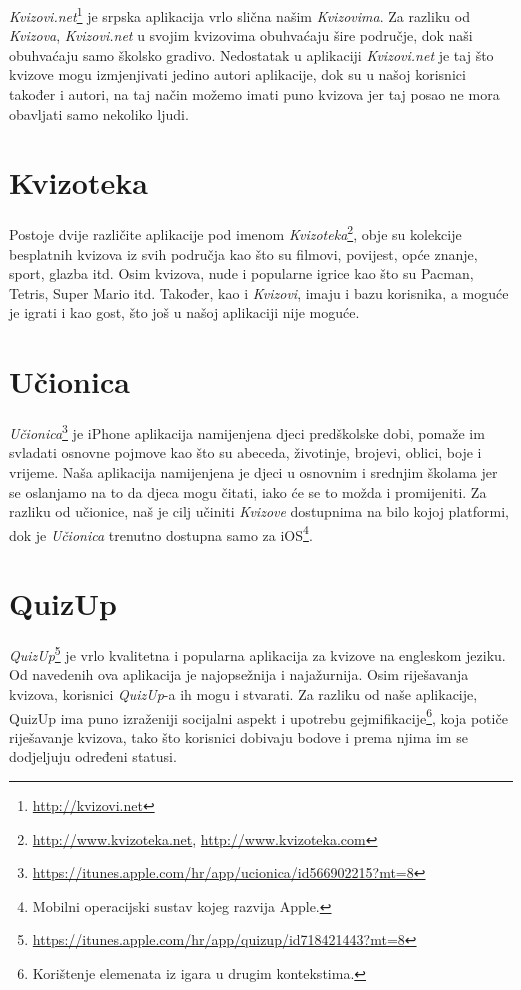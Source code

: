 \documentclass{scrreprt}
\begin{document}
\emph{Kvizovi.net}\footnote{\url{http://kvizovi.net}} je srpska aplikacija vrlo slična
našim \emph{Kvizovima}. Za razliku od \emph{Kvizova}, \emph{Kvizovi.net} u
svojim kvizovima obuhvaćaju šire područje, dok naši obuhvaćaju samo školsko
gradivo. Nedostatak u aplikaciji \emph{Kvizovi.net} je taj što kvizove mogu
izmjenjivati jedino autori aplikacije, dok su u našoj korisnici također i
autori, na taj način možemo imati puno kvizova jer taj posao ne mora obavljati
samo nekoliko ljudi.

\section{Kvizoteka}

Postoje dvije različite aplikacije pod imenom
\emph{Kvizoteka}\footnote{\url{http://www.kvizoteka.net},
\url{http://www.kvizoteka.com}}, obje su kolekcije besplatnih kvizova iz svih
područja kao što su filmovi, povijest, opće znanje, sport, glazba itd. Osim
kvizova, nude i popularne igrice kao što su Pacman, Tetris, Super Mario itd.
Također, kao i \emph{Kvizovi}, imaju i bazu korisnika, a moguće je igrati i kao
gost, što još u našoj aplikaciji nije moguće.

\section{Učionica}

\emph{Učionica}\footnote{\url{https://itunes.apple.com/hr/app/ucionica/id566902215?mt=8}}
je iPhone aplikacija namijenjena djeci predškolske dobi, pomaže im svladati
osnovne pojmove kao što su abeceda, životinje, brojevi, oblici, boje i vrijeme.
Naša aplikacija namijenjena je djeci u osnovnim i srednjim školama jer se
oslanjamo na to da djeca mogu čitati, iako će se to možda i promijeniti. Za
razliku od učionice, naš je cilj učiniti \emph{Kvizove} dostupnima na bilo kojoj
platformi, dok je \emph{Učionica} trenutno dostupna samo za iOS\footnote{Mobilni
operacijski sustav kojeg razvija Apple.}.

\section{QuizUp}

\emph{QuizUp}\footnote{\url{https://itunes.apple.com/hr/app/quizup/id718421443?mt=8}}
je vrlo kvalitetna i popularna aplikacija za kvizove na engleskom jeziku. Od
navedenih ova aplikacija je najopsežnija i najažurnija. Osim riješavanja
kvizova, korisnici \emph{QuizUp}-a ih mogu i stvarati. Za razliku od naše
aplikacije, QuizUp ima puno izraženiji socijalni aspekt i upotrebu
gejmifikacije\footnote{Korištenje elemenata iz igara u drugim kontekstima.},
koja potiče riješavanje kvizova, tako što korisnici dobivaju bodove i prema
njima im se dodjeljuju određeni statusi.
\end{document}
